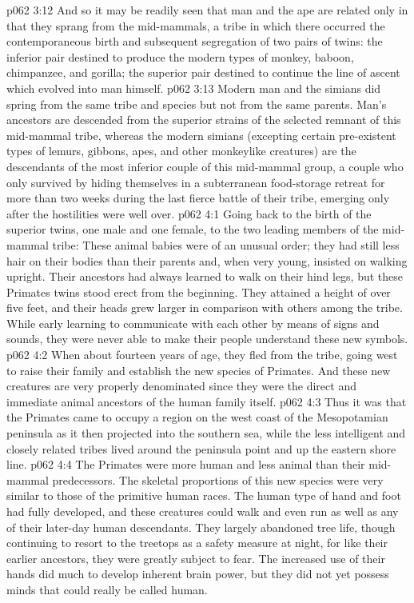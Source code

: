 \vs p062 3:12 And so it may be readily seen that man and the ape are related only in that they sprang from the mid\hyp{}mammals, a tribe in which there occurred the contemporaneous birth and subsequent segregation of two pairs of twins: the inferior pair destined to produce the modern types of monkey, baboon, chimpanzee, and gorilla; the superior pair destined to continue the line of ascent which evolved into man himself.
\vs p062 3:13 Modern man and the simians did spring from the same tribe and species but not from the same parents. Man’s ancestors are descended from the superior strains of the selected remnant of this mid\hyp{}mammal tribe, whereas the modern simians (excepting certain pre\hyp{}existent types of lemurs, gibbons, apes, and other monkeylike creatures) are the descendants of the most inferior couple of this mid\hyp{}mammal group, a couple who only survived by hiding themselves in a subterranean food\hyp{}storage retreat for more than two weeks during the last fierce battle of their tribe, emerging only after the hostilities were well over.
\vs p062 4:1 Going back to the birth of the superior twins, one male and one female, to the two leading members of the mid\hyp{}mammal tribe: These animal babies were of an unusual order; they had still less hair on their bodies than their parents and, when very young, insisted on walking upright. Their ancestors had always learned to walk on their hind legs, but these Primates twins stood erect from the beginning. They attained a height of over five feet, and their heads grew larger in comparison with others among the tribe. While early learning to communicate with each other by means of signs and sounds, they were never able to make their people understand these new symbols.
\vs p062 4:2 When about fourteen years of age, they fled from the tribe, going west to raise their family and establish the new species of Primates. And these new creatures are very properly denominated  since they were the direct and immediate animal ancestors of the human family itself.
\vs p062 4:3 Thus it was that the Primates came to occupy a region on the west coast of the Mesopotamian peninsula as it then projected into the southern sea, while the less intelligent and closely related tribes lived around the peninsula point and up the eastern shore line.
\vs p062 4:4 \pc The Primates were more human and less animal than their mid\hyp{}mammal predecessors. The skeletal proportions of this new species were very similar to those of the primitive human races. The human type of hand and foot had fully developed, and these creatures could walk and even run as well as any of their later\hyp{}day human descendants. They largely abandoned tree life, though continuing to resort to the treetops as a safety measure at night, for like their earlier ancestors, they were greatly subject to fear. The increased use of their hands did much to develop inherent brain power, but they did not yet possess minds that could really be called human.
